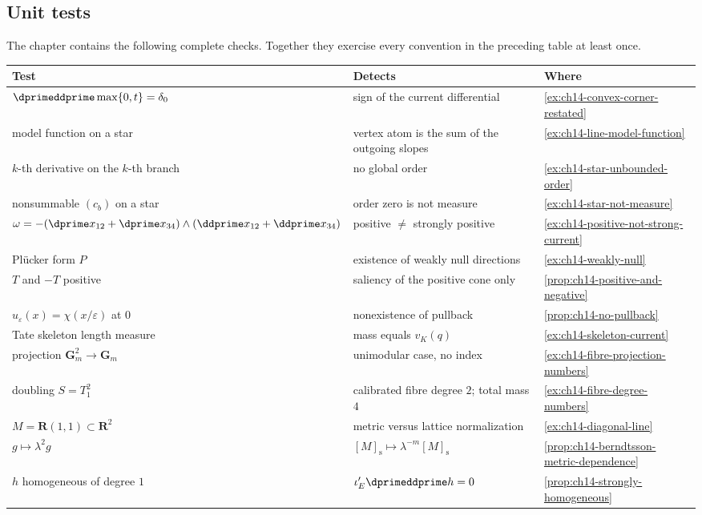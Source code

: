 \subsection{Unit tests}
\label{sec:ch14-unit-tests}

The chapter contains the following complete checks.  Together they exercise
every convention in the preceding table at least once.

\begin{center}
\small
\begin{tabular}{p{}|p{}|p{}}
\textbf{Test}&\textbf{Detects}&\textbf{Where}\\ \hline
$\dprimeddprime\max\{0,t\}=\delta_0$
  &sign of the current differential
  &\cref{ex:ch14-convex-corner-restated}\\
model function on a star
  &vertex atom is the sum of the outgoing slopes
  &\cref{ex:ch14-line-model-function}\\
$k$-th derivative on the $k$-th branch
  &no global order
  &\cref{ex:ch14-star-unbounded-order}\\
nonsummable $(c_b)$ on a star
  &order zero is not measure
  &\cref{ex:ch14-star-not-measure}\\
$\omega=-(\dprime x_{12}+\dprime x_{34})
   \wedge(\ddprime x_{12}+\ddprime x_{34})$
  &positive $\neq$ strongly positive
  &\cref{ex:ch14-positive-not-strong-current}\\
Pl\"ucker form $\widehat P$
  &existence of weakly null directions
  &\cref{ex:ch14-weakly-null}\\
$T$ and $-T$ positive
  &saliency of the positive cone only
  &\cref{prop:ch14-positive-and-negative}\\
$u_\varepsilon(x)=\chi(x/\varepsilon)$ at $0$
  &nonexistence of pullback
  &\cref{prop:ch14-no-pullback}\\
Tate skeleton length measure
  &mass equals $v_K(q)$
  &\cref{ex:ch14-skeleton-current}\\
projection $\mathbf G_m^2\to\mathbf G_m$
  &unimodular case, no index
  &\cref{ex:ch14-fibre-projection-numbers}\\
doubling $S=T_1^2$
  &calibrated fibre degree $2$; total mass $4$
  &\cref{ex:ch14-fibre-degree-numbers}\\
$M=\mathbf R(1,1)\subset\mathbf R^2$
  &metric versus lattice normalization
  &\cref{ex:ch14-diagonal-line}\\
$g\mapsto\lambda^2g$
  &$[M]_{\mathrm s}\mapsto\lambda^{-m}[M]_{\mathrm s}$
  &\cref{prop:ch14-berndtsson-metric-dependence}\\
$h$ homogeneous of degree $1$
  &$\iota'_E\dprimeddprime h=0$
  &\cref{prop:ch14-strongly-homogeneous}
\end{tabular}
\end{center}

